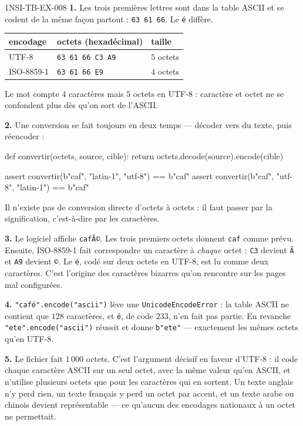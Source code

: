 \begin{corrige}{1NSI-TB-EX-008}
\textbf{1.} Les trois premières lettres sont dans la table ASCII et se codent de
la même façon partout : \lstinline{63 61 66}. Le \lstinline{é} diffère.
\begin{center}
\begin{tabular}{lll}
\hline
encodage & octets (hexadécimal) & taille \\
\hline
UTF-8 & \lstinline{63 61 66 C3 A9} & $5$ octets \\
ISO-8859-1 & \lstinline{63 61 66 E9} & $4$ octets \\
\hline
\end{tabular}
\end{center}
Le mot compte $4$ caractères mais $5$ octets en UTF-8 : caractère et octet ne se
confondent plus dès qu'on sort de l'ASCII.

\textbf{2.} Une conversion se fait toujours en deux temps — décoder vers du
texte, puis réencoder :
\begin{python}
def convertir(octets, source, cible):
    return octets.decode(source).encode(cible)

assert convertir(b"caf", "latin-1", "utf-8") == b"caf"
assert convertir(b"caf", "utf-8", "latin-1") == b"caf"
\end{python}
Il n'existe pas de conversion directe d'octets à octets : il faut passer par la
signification, c'est-à-dire par les caractères.

\textbf{3.} Le logiciel affiche \lstinline{cafÃ©}. Les trois premiers octets
donnent \lstinline{caf} comme prévu. Ensuite, ISO-8859-1 fait correspondre un
caractère à \emph{chaque} octet : \lstinline{C3} devient \lstinline{Ã} et
\lstinline{A9} devient \lstinline{©}. Le \lstinline{é}, codé sur deux octets en
UTF-8, est lu comme deux caractères. C'est l'origine des \og{} caractères
bizarres \fg{} qu'on rencontre sur les pages mal configurées.

\textbf{4.} \lstinline{"café".encode("ascii")} lève une
\lstinline{UnicodeEncodeError} : la table ASCII ne contient que $128$
caractères, et \lstinline{é}, de code $233$, n'en fait pas partie. En revanche
\lstinline{"ete".encode("ascii")} réussit et donne \lstinline{b"ete"} —
exactement les mêmes octets qu'en UTF-8.

\textbf{5.} Le fichier fait $1\,000$ octets. C'est l'argument décisif en faveur
d'UTF-8 : il code chaque caractère ASCII sur un seul octet, avec la même valeur
qu'en ASCII, et n'utilise plusieurs octets que pour les caractères qui en
sortent. Un texte anglais n'y perd rien, un texte français y perd un octet par
accent, et un texte arabe ou chinois devient représentable — ce qu'aucun des
encodages nationaux à un octet ne permettait.
\end{corrige}
